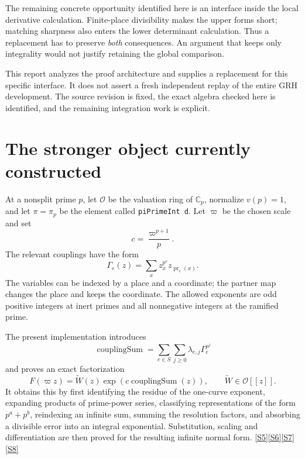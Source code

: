\documentclass[11pt,letterpaper]{article}
\theoremstyle{remark}
\newcommand{\OO}{\mathcal O}
\newcommand{\code}[1]{{\small\nolinkurl{#1}}}
\newcommand{\src}[1]{\hyperref[src:#1]{[S#1]}}
\begin{document}
The remaining concrete opportunity identified here is an interface inside the
local derivative calculation. Finite-place divisibility makes the upper forms
short; matching sharpness also enters the lower determinant calculation. Thus a
replacement has to preserve \emph{both} consequences. An argument that keeps only
integrality would not justify retaining the global comparison.

This report analyzes the proof architecture and supplies a replacement for this
specific interface. It does not assert a fresh independent replay of the entire
GRH development. The source revision is fixed, the exact algebra checked here is
identified, and the remaining integration work is explicit.

\section{The stronger object currently constructed}
\label{sec:old}

At a nonsplit prime \(p\), let \(\OO\) be the valuation ring of
\(\mathbb C_p\), normalize \(v(p)=1\), and let \(\pi=\pi_p\) be the element
called \code{piPrimeInt d}. Let \(\varpi\) be the chosen scale and set
\[
 c=\frac{\varpi^{p+1}}p.
\]
The relevant couplings have the form
\begin{equation}
 \Gamma_e(z)=\sum_{x}z_x^{p^e}z_{\operatorname{pr}_e(x)}.
 \label{eq:couplings}
\end{equation}
The variables can be indexed by a place and a coordinate; the partner map changes
the place and keeps the coordinate. The allowed exponents are odd positive
integers at inert primes and all nonnegative integers at the ramified prime.

The present implementation introduces
\begin{equation}
 \operatorname{couplingSum}
   =\sum_{e\in S}\sum_{j\ge0}\lambda_{e,j}\Gamma_e^{p^j}
 \label{eq:normal}
\end{equation}
and proves an exact factorization
\begin{equation}
 F(\varpi z)=\widetilde W(z)
       \exp\!\left(c\operatorname{couplingSum}(z)\right),
 \qquad \widetilde W\in\OO[[z]]. \label{eq:exactnormal}
\end{equation}
It obtains this by first identifying the residue of the one-curve exponent,
expanding products of prime-power series, classifying representations of the
form \(p^a+p^b\), reindexing an infinite sum, summing the resolution factors,
and absorbing a divisible error into an integral exponential. Substitution,
scaling and differentiation are then proved for the resulting infinite normal
form. \src{5}\src{6}\src{7}\src{8}
\end{document}
